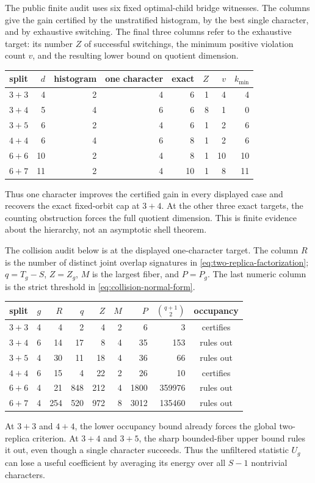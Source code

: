 \documentclass[11pt]{article}
\theoremstyle{definition}
\theoremstyle{remark}
\begin{document}
The public finite audit uses six fixed optimal-child bridge witnesses.  The
columns give the gain certified by the unstratified histogram, by the best
single character, and by exhaustive switching.  The final three columns
refer to the exhaustive target: its number $Z$ of successful switchings, the
minimum positive violation count $v$, and the resulting lower bound on
quotient dimension.
\begin{center}
\begin{tabular}{c|rrrrrrr}
\toprule
split & $d$ & histogram & one character & exact & $Z$ & $v$ & $k_{\min}$\\
\midrule
$3+3$ &4&2&4&6&1&4&4\\
$3+4$ &5&4&6&6&8&1&0\\
$3+5$ &6&2&4&6&1&2&6\\
$4+4$ &6&4&6&8&1&2&6\\
$6+6$ &10&2&4&8&1&10&10\\
$6+7$ &11&2&4&10&1&8&11\\
\bottomrule
\end{tabular}
\end{center}
Thus one character improves the certified gain in every displayed case and
recovers the exact fixed-orbit cap at $3+4$.  At the other three exact
targets, the counting obstruction forces the full quotient dimension.  This
is finite evidence about the hierarchy, not an asymptotic shell theorem.

The collision audit below is at the displayed one-character target.  The
column $R$ is the number of distinct joint overlap signatures in
\eqref{eq:two-replica-factorization}; $q=T_g-S$, $Z=Z_g$, $M$ is the largest
fiber, and $P=P_g$.  The last numeric column is the strict threshold in
\eqref{eq:collision-normal-form}.
\begin{center}
\begin{tabular}{c|rrrrrrr|c}
\toprule
split & $g$ & $R$ & $q$ & $Z$ & $M$ & $P$ & $\binom{q+1}{2}$ & occupancy\\
\midrule
$3+3$ &4&4 & 2& 4&2& 6&  3&certifies\\
$3+4$ &6&14&17& 8&4&35&153&rules out\\
$3+5$ &4&30&11&18&4&36& 66&rules out\\
$4+4$ &6&15& 4&22&2&26& 10&certifies\\
$6+6$ &4&21&848&212&4&1800&359976&rules out\\
$6+7$ &4&254&520&972&8&3012&135460&rules out\\
\bottomrule
\end{tabular}
\end{center}
At $3+3$ and $4+4$, the lower occupancy bound already forces the global
two-replica criterion.  At $3+4$ and $3+5$, the sharp bounded-fiber upper
bound rules it out, even though a single character succeeds.  Thus the
unfiltered statistic $U_g$ can lose a useful coefficient by averaging its
energy over all $S-1$ nontrivial characters.
\end{document}
